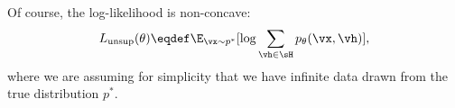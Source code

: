 
Of course, the log-likelihood is non-concave:
\begin{align}
  L_\text{unsup}(\theta) \eqdef \E_{\vx \sim p^*}[\log \sum_{\vh \in \sH} p_\theta(\vx,\vh)],
\end{align}
where we are assuming for simplicity that we have infinite data drawn from the true distribution $p^*$.

